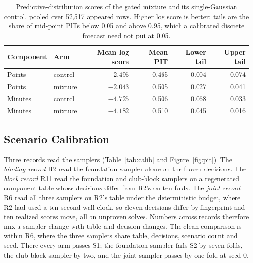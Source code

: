 \documentclass[11pt,a4paper]{article}
\begin{document}
\begin{table}[!htb]
\centering\small
\caption{Predictive-distribution scores of the gated mixture and its single-Gaussian control, pooled over 52{,}517 appeared rows. Higher log score is better; tails are the share of mid-point PITs below 0.05 and above 0.95, which a calibrated discrete forecast need not put at 0.05.}
\label{tab:dist}
\begin{tabular}{llrrrr}
\toprule
Component & Arm & Mean log score & Mean PIT & Lower tail & Upper tail \\
\midrule
Points & control & $-2.495$ & 0.465 & 0.004 & 0.074 \\
Points & mixture & $-2.043$ & 0.505 & 0.027 & 0.041 \\
Minutes & control & $-4.725$ & 0.506 & 0.068 & 0.033 \\
Minutes & mixture & $-4.182$ & 0.510 & 0.045 & 0.016 \\
\bottomrule
\end{tabular}
\end{table}

\subsection{Scenario Calibration}
\label{sec:calib}

Three records read the samplers (Table~\ref{tab:calib} and Figure~\ref{fig:pit}). The \emph{binding record} R2 read the foundation sampler alone on the frozen decisions. The \emph{block record} R11 read the foundation and club-block samplers on a regenerated component table whose decisions differ from R2's on ten folds. The \emph{joint record} R6 read all three samplers on R2's table under the deterministic budget, where R2 had used a ten-second wall clock, so eleven decisions differ by fingerprint and ten realized scores move, all on unproven solves. Numbers across records therefore mix a sampler change with table and decision changes. The clean comparison is within R6, where the three samplers share table, decisions, scenario count and seed. There every arm passes S1; the foundation sampler fails S2 by seven folds, the club-block sampler by two, and the joint sampler passes by one fold at seed 0.
\end{document}
